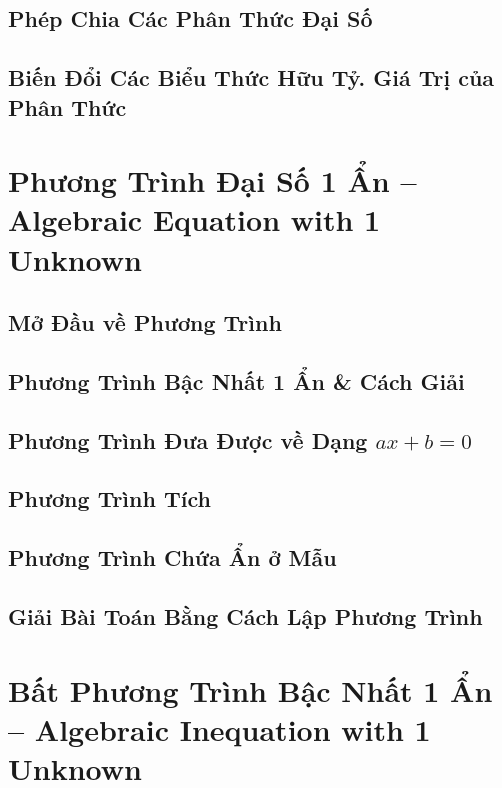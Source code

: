 \documentclass{article}
\numberwithin{equation}{section}
\begin{document}
\subsection{Phép Chia Các Phân Thức Đại Số}

\subsection{Biến Đổi Các Biểu Thức Hữu Tỷ. Giá Trị của Phân Thức}


\section{Phương Trình Đại Số 1 Ẩn -- Algebraic Equation with 1 Unknown}

\subsection{Mở Đầu về Phương Trình}

\subsection{Phương Trình Bậc Nhất 1 Ẩn \& Cách Giải}

\subsection{Phương Trình Đưa Được về Dạng $ax + b = 0$}

\subsection{Phương Trình Tích}

\subsection{Phương Trình Chứa Ẩn ở Mẫu}

\subsection{Giải Bài Toán Bằng Cách Lập Phương Trình}


\section{Bất Phương Trình Bậc Nhất 1 Ẩn -- Algebraic Inequation with 1 Unknown}
\end{document}
